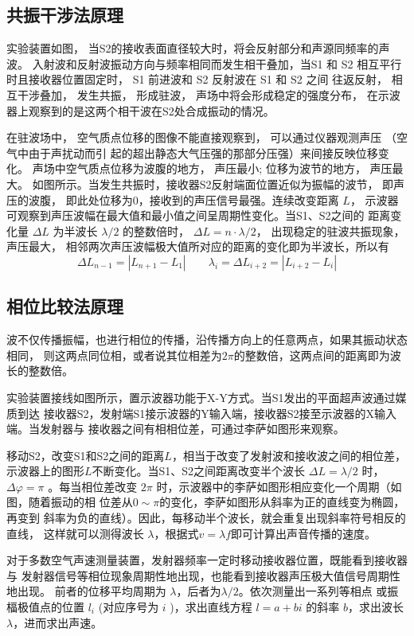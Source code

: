 \documentclass{article}
\begin{document}
\subsection*{共振干涉法原理}
实验装置如图， 当S2的接收表面直径较大时，将会反射部分和声源同频率的声波。
入射波和反射波振动方向与频率相同而发生相干叠加，当S1 和 S2 相互平行
时且接收器位置固定时， S1 前进波和 S2 反射波在 S1 和 S2 之间
往返反射， 相互干涉叠加， 发生共振， 形成驻波， 声场中将会形成稳定的强度分布，
在示波器上观察到的是这两个相干波在S2处合成振动的情况。

在驻波场中， 空气质点位移的图像不能直接观察到， 可以通过仪器观测声压
（空气中由于声扰动而引 起的超出静态大气压强的那部分压强）来间接反映位移变化。
声场中空气质点位移为波腹的地方， 声压最小; 位移为波节的地方， 声压最大。
如图所示。当发生共振时，接收器S2反射端面位置近似为振幅的波节，
即声压的波腹， 即此处位移为0，接收到的声压信号最强。连续改变距离 $L$，
示波器可观察到声压波幅在最大值和最小值之间呈周期性变化。当S1、S2之间的
距离变化量 $\Delta L$ 为半波长 $\lambda / 2$ 的整数倍时，
$\Delta L=n \cdot \lambda / 2$， 出现稳定的驻波共振现象， 声压最大，
相邻两次声压波幅极大值所对应的距离的变化即为半波长，所以有
$$\Delta L_{n-1}=\left|L_{n+1}-L_1\right|\qquad\lambda_i=\Delta L_{i+2}=\left|L_{i+2}-L_i\right|$$

\subsection*{相位比较法原理}
波不仅传播振幅，也进行相位的传播，沿传播方向上的任意两点，如果其振动状态相同，
则这两点同位相，或者说其位相差为$2\pi$的整数倍，这两点间的距离即为波长的整数倍。

实验装置接线如图所示，置示波器功能于X-Y方式。当S1发出的平面超声波通过媒质到达
接收器S2，发射端S1接示波器的Y输入端，接收器S2接至示波器的X输入端。当发射器与
接收器之间有相相位差，可通过李萨如图形来观察。

移动S2，改变S1和S2之间的距离$L$，相当于改变了发射波和接收波之间的相位差，
示波器上的图形$L$不断变化。当S1、S2之间距离改变半个波长
$\Delta L=\lambda / 2$ 时，$\Delta \varphi=\pi$ 。每当相位差改变
$2 \pi$ 时，示波器中的李萨如图形相应变化一个周期（如图，随着振动的相
位差从$0 \sim \pi$的变化，李萨如图形从斜率为正的直线变为椭圆，再变到
斜率为负的直线）。因此，每移动半个波长，就会重复出现斜率符号相反的直线，
这样就可以测得波长 $\lambda$，根据式$v=\lambda f$即可计算出声音传播的速度。

对于多数空气声速测量装置，发射器频率一定时移动接收器位置，既能看到接收器与
发射器信号等相位现象周期性地出现，也能看到接收器声压极大值信号周期性地出现。
前者的位移平均周期为 $\lambda$，后者为$\lambda/2$。依次测量出一系列等相点
或振楅极值点的位置 $l_i$ (对应序号为 $i$ )，求出直线方程 $l=a+bi$ 的斜率
$b$，求出波长 $\lambda$，进而求出声速。
\end{document}
